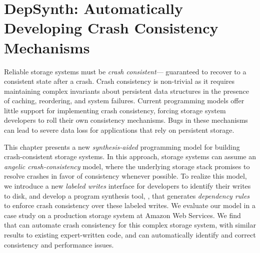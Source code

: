 %
\chapter{DepSynth: Automatically Developing Crash Consistency Mechanisms}
\label{c:depsynth}

Reliable storage systems must be \emph{crash consistent}---%
guaranteed to recover to a consistent state after a crash. %
Crash consistency is non-trivial
as it requires maintaining complex invariants
about persistent data structures 
in the presence of caching, reordering, and system failures.
Current programming models offer little support for implementing crash consistency,
forcing storage system developers to roll their own consistency mechanisms.
Bugs in these mechanisms can lead to severe data loss
for applications that rely on persistent storage.\tighten

This chapter presents a new \emph{synthesis-aided} programming model
for building crash-consistent storage systems.
In this approach, storage systems can assume
an \emph{angelic crash-consistency} model,
where the underlying storage stack
promises to resolve crashes in favor of consistency whenever possible.
To realize this model,
we introduce a new \emph{labeled writes} interface for developers to identify their writes to disk,
and develop a program synthesis tool, \depsynth,
that generates \emph{dependency rules}
to enforce crash consistency over these labeled writes.
We evaluate our model in a case study
on a production storage system at Amazon Web Services.
We find that \depsynth can automate crash consistency for this complex storage system,
with similar results to existing expert-written code,
and can automatically identify and correct consistency and performance issues.









% 









% 

